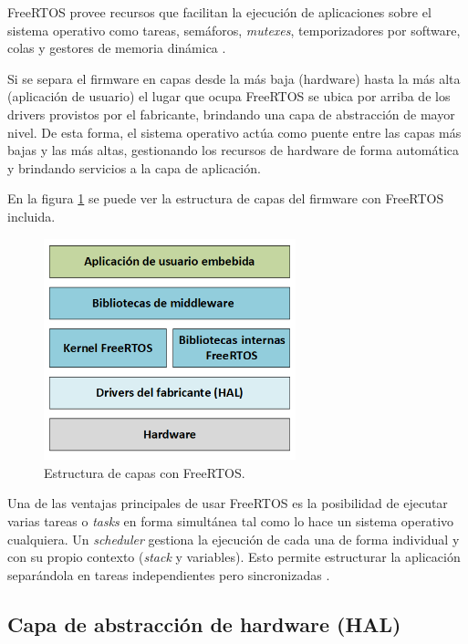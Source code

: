 FreeRTOS provee recursos que facilitan la ejecución de aplicaciones sobre el sistema operativo como tareas, semáforos, \textit{mutexes}, temporizadores por software, colas y gestores de memoria dinámica \citep{WEBSITE:1}.

Si se separa el firmware en capas desde la más baja (hardware) hasta la más alta (aplicación de usuario) el lugar que ocupa FreeRTOS se ubica por arriba de los drivers provistos por el fabricante, brindando una capa de abstracción de mayor nivel. De esta forma, el sistema operativo actúa como puente entre las capas más bajas y las más altas, gestionando los recursos de hardware de forma automática y brindando servicios a la capa de aplicación.

En la figura \ref{fig:capas} se puede ver la estructura de capas del firmware con FreeRTOS incluida.

\begin{figure}[H]
\centering
\includegraphics[width=0.65\textwidth]{./Figures/capas.png}
\caption{Estructura de capas con FreeRTOS.}
\label{fig:capas}
\end{figure}

Una de las ventajas principales de usar FreeRTOS es la posibilidad de ejecutar varias tareas o \textit{tasks} en forma simultánea tal como lo hace un sistema operativo cualquiera. Un \textit{scheduler} gestiona la ejecución de cada una de forma individual y con su propio contexto (\textit{stack} y variables). Esto permite estructurar la aplicación separándola en tareas independientes pero sincronizadas \citep{WEBSITE:FREERTOS}.

\subsection{Capa de abstracción de hardware (HAL)}

